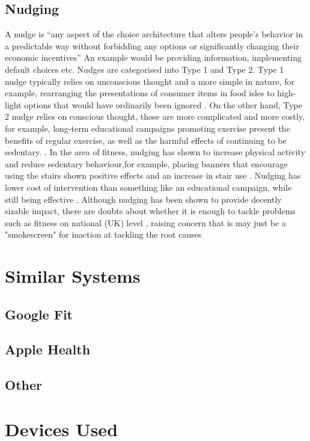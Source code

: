 \subsection{Nudging}
A nudge is “any aspect of the choice architecture that alters people's behavior in a predictable way without forbidding any options or significantly changing their economic incentives” \cite{nudgeDef} An example would be providing information, implementing default choices etc. Nudges are categorised into Type 1 and Type 2. Type 1 nudge typically relies on unconscious thought and a more simple in nature, for example, rearranging  the presentations of consumer items in food isles to high-light options that would have ordinarily been ignored \cite{NudgeCritical}. On the other hand, Type 2 nudge relies on conscious thought, those are more complicated and more costly, for example, long-term educational campaigns promoting exercise present the benefits of regular exercise, as well as the harmful effects of continuing to be sedentary. \cite{NudgeCritical}.  In the area of fitness, nudging has shown to increase physical activity and reduce sedentary behaviour,for example, placing banners that encourage using the stairs shown positive effects and an increase in stair use \cite{FORBERGER2022106922, Forberger2019}. Nudging has lower cost of intervention than something like an educational campaign, while still being effective \cite{nudgeCost}. Although nudging has been shown to provide decently sizable impact, there are doubts about whether it is enough to tackle problems such as fitness on national (UK) level , raising concern that is may just be a "smokescreen" for inaction at tackling the root causes  \cite{Raynerd2177}
\section{Similar Systems}
\label{section:similarSystems}
\subsection{Google Fit}
\subsection{Apple Health}
\subsection{Other}
\section{Devices Used}
